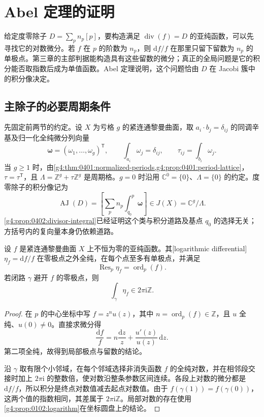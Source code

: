 
% 
% 

\section{Abel 定理的证明}
\label{g4:sec:0403}

给定度零除子 \(D=\sum_p n_p[p]\)，要构造满足 \(\operatorname{div}(f)=D\) 的亚纯函数，可以先寻找它的对数微分。若 \(f\) 在 \(p\) 的阶数为 \(n_p\)，则 \(\mathrm{d}f/f\) 在那里只留下留数为 \(n_p\) 的单极点。第三章的主部判据能构造具有这些留数的微分；真正的全局问题是它的积分能否取指数后成为单值函数。Abel 定理说明，这个问题恰由 \(D\) 在 Jacobi 簇中的积分像决定。

\subsection{主除子的必要周期条件}
\label{g4:subsec:0403:01}
先固定前两节的约定。设 \(X\) 为亏格 \(g\) 的紧连通黎曼曲面，取 \(a_i\cdot b_j=\delta_{ij}\) 的同调辛基及归一化全纯微分列向量
\[
	\boldsymbol\omega=(\omega_1,\ldots,\omega_g)^{\mathsf T},\qquad
	\int_{a_i}\omega_j=\delta_{ij},\qquad
	\tau_{ij}=\int_{b_i}\omega_j.
\]
当 \(g\ge1\) 时，由\cref{g4:thm:0401:normalized-periods,g4:prop:0401:period-lattice}，\(\tau=\tau^{\mathsf T}\)，且 \(\Lambda=\mathbb Z^g+\tau\mathbb Z^g\) 是周期格。\(g=0\) 时沿用 \(\mathbb C^0=\{0\}\)、\(\Lambda=\{0\}\) 的约定。度零除子的积分像记为
\[
	\operatorname{AJ}(D)
	=\left[\sum_p n_p\int_{q_0}^{p}\boldsymbol\omega\right]
	\in J(X)=\mathbb C^g/\Lambda.
\]
\cref{g4:prop:0402:divisor-integral}已经证明这个类与积分道路及基点 \(q_0\) 的选择无关；方括号内的复向量本身仍依赖道路。

\begin{proposition}
	\label{g4:prop:0403:logarithmic-differential}
	设 \(f\) 是紧连通黎曼曲面 \(X\) 上不恒为零的亚纯函数。其[logarithmic differential] \(\eta_f=\mathrm{d}f/f\) 在零极点之外全纯，在每个点至多有单极点，并满足
	\[
		\operatorname{Res}_p\eta_f=\operatorname{ord}_p(f).
	\]
	若闭路 \(\gamma\) 避开 \(f\) 的零极点，则
	\[
		\int_\gamma\eta_f\in2\pi\mathrm{i}\mathbb Z.
	\]
\end{proposition}
\begin{proof}
	在 \(p\) 的中心坐标中写 \(f=z^n u(z)\)，其中 \(n=\operatorname{ord}_p(f)\in\mathbb Z\)，且 \(u\) 全纯、\(u(0)\ne0\)。直接求微分得
	\[
		\frac{\mathrm{d}f}{f}
		=n\frac{\mathrm{d}z}{z}+\frac{u'(z)}{u(z)}\,\mathrm{d}z.
	\]
	第二项全纯，故得到局部极点与留数的结论。

	沿 \(\gamma\) 取有限个小邻域，在每个邻域选择非消失函数 \(f\) 的全纯对数，并在相邻段交接时加上 \(2\pi\mathrm{i}\) 的整数倍，使对数沿整条参数区间连续。各段上对数的微分都是 \(\mathrm{d}f/f\)，所以积分是终点对数值减去起点对数值。由于 \(f(\gamma(1))=f(\gamma(0))\)，这两个值的指数相同，其差属于 \(2\pi\mathrm{i}\mathbb Z\)。局部对数的存在使用\cref{g4:prop:0102:logarithm}在坐标圆盘上的结论。
\end{proof}

